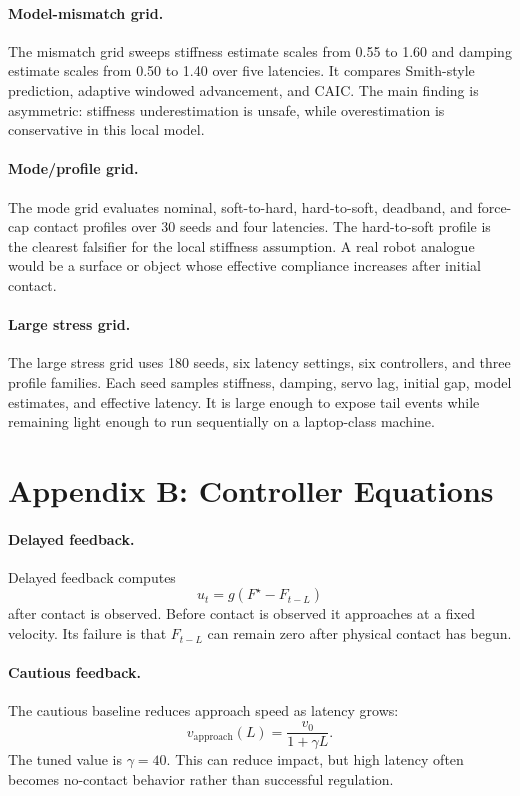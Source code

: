 \documentclass{article}
\newcommand{\lat}{L}
\newcommand{\force}{F}
\newcommand{\caic}{CAIC}
\begin{document}
\paragraph{Model-mismatch grid.}
The mismatch grid sweeps stiffness estimate scales from 0.55 to 1.60 and damping estimate scales from 0.50 to 1.40 over five latencies. It compares Smith-style prediction, adaptive windowed advancement, and \caic{}. The main finding is asymmetric: stiffness underestimation is unsafe, while overestimation is conservative in this local model.

\paragraph{Mode/profile grid.}
The mode grid evaluates nominal, soft-to-hard, hard-to-soft, deadband, and force-cap contact profiles over 30 seeds and four latencies. The hard-to-soft profile is the clearest falsifier for the local stiffness assumption. A real robot analogue would be a surface or object whose effective compliance increases after initial contact.

\paragraph{Large stress grid.}
The large stress grid uses 180 seeds, six latency settings, six controllers, and three profile families. Each seed samples stiffness, damping, servo lag, initial gap, model estimates, and effective latency. It is large enough to expose tail events while remaining light enough to run sequentially on a laptop-class machine.

\section{Appendix B: Controller Equations}

\paragraph{Delayed feedback.}
Delayed feedback computes
\begin{equation}
u_t = g(\force^\star-\force_{t-\lat})
\end{equation}
after contact is observed. Before contact is observed it approaches at a fixed velocity. Its failure is that $\force_{t-\lat}$ can remain zero after physical contact has begun.

\paragraph{Cautious feedback.}
The cautious baseline reduces approach speed as latency grows:
\begin{equation}
v_{\mathrm{approach}}(\lat)=
\frac{v_0}{1+\gamma\lat}.
\end{equation}
The tuned value is $\gamma=40$. This can reduce impact, but high latency often becomes no-contact behavior rather than successful regulation.
\end{document}
